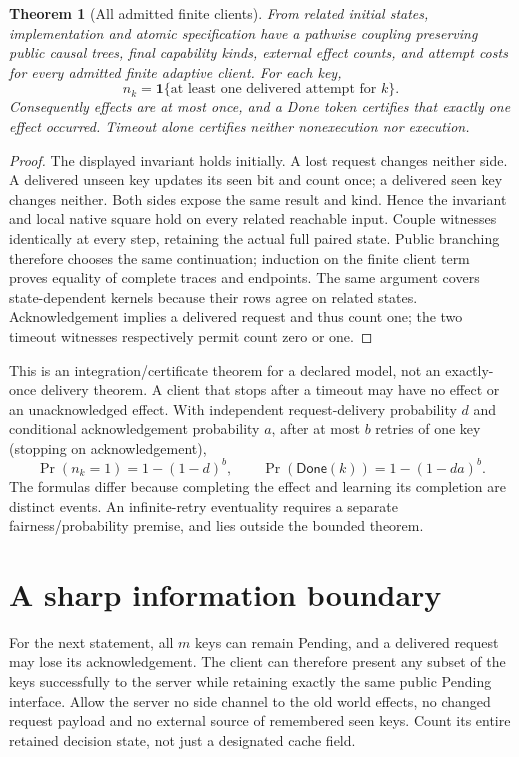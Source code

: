 \documentclass[11pt]{article}
\newtheorem{theorem}{Theorem}
\begin{document}
\begin{theorem}[All admitted finite clients]
From related initial states, implementation and atomic specification have a pathwise coupling preserving public causal trees, final capability kinds, external effect counts, and attempt costs for every admitted finite adaptive client. For each key,
\[
n_k=\mathbf 1\{\text{at least one delivered attempt for }k\}.
\]
Consequently effects are at most once, and a Done token certifies that exactly one effect occurred. Timeout alone certifies neither nonexecution nor execution.
\end{theorem}
\begin{proof}
The displayed invariant holds initially. A lost request changes neither side. A delivered unseen key updates its seen bit and count once; a delivered seen key changes neither. Both sides expose the same result and kind. Hence the invariant and local native square hold on every related reachable input. Couple witnesses identically at every step, retaining the actual full paired state. Public branching therefore chooses the same continuation; induction on the finite client term proves equality of complete traces and endpoints. The same argument covers state-dependent kernels because their rows agree on related states. Acknowledgement implies a delivered request and thus count one; the two timeout witnesses respectively permit count zero or one.\end{proof}

This is an integration/certificate theorem for a declared model, not an exactly-once delivery theorem. A client that stops after a timeout may have no effect or an unacknowledged effect. With independent request-delivery probability $d$ and conditional acknowledgement probability $a$, after at most $b$ retries of one key (stopping on acknowledgement),
\[
\Pr(n_k=1)=1-(1-d)^b,\qquad
\Pr(\mathsf{Done}(k))=1-(1-da)^b.
\]
The formulas differ because completing the effect and learning its completion are distinct events. An infinite-retry eventuality requires a separate fairness/probability premise, and lies outside the bounded theorem.

\section{A sharp information boundary}
For the next statement, all $m$ keys can remain Pending, and a delivered request may lose its acknowledgement. The client can therefore present any subset of the keys successfully to the server while retaining exactly the same public Pending interface. Allow the server no side channel to the old world effects, no changed request payload and no external source of remembered seen keys. Count its entire retained decision state, not just a designated cache field.
\end{document}
